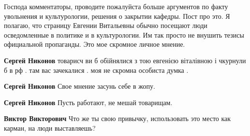 \begin{itemize}
\begin{itemize}
\end{itemize}

 

Господа комментаторы, проводите пожалуйста больше аргументов по факту
увольнения и культурологии, решения о закрытии кафедры. Пост про это. Я
полагаю, что страницу Евгении Витальевны обычно посещают люди осведомленные в
политике и в культурологии. Им так просто не внушить тезисы официальной
пропаганды. Это мое скромное личное мнение.

\begin{itemize}
 
\textbf{Сергей Никонов} товарисч ви б обійнялися з тою евгенією віталівною і чкурнули б в рф . там вас зачекалися . моя не скромна особиста думка .

 
\textbf{Сергей Никонов} Свое мнение засунь себе в жопу.

 
\textbf{Сергей Никонов} Пусть работают, не мешай товарищам.

 
\textbf{Виктор Викторович} Что же ты свою привычку, использовать это место как карман, на люди выставляешь?

 

\end{itemize}
\end{itemize}
